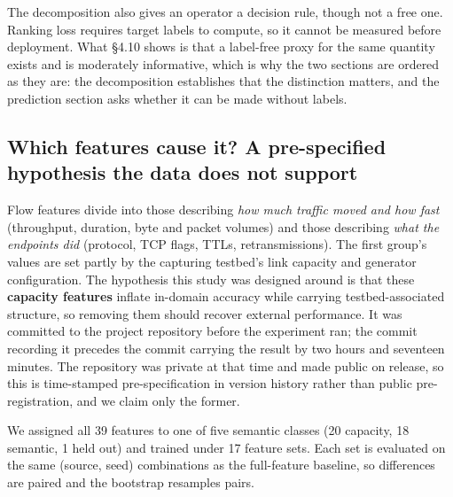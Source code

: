 \documentclass[preprint,12pt]{elsarticle}
\begin{document}
The decomposition also gives an operator a decision rule, though not a free one. Ranking loss requires target labels to compute, so it cannot be measured before deployment. What \S{}4.10 shows is that a label-free proxy for the same quantity exists and is moderately informative, which is why the two sections are ordered as they are: the decomposition establishes that the distinction matters, and the prediction section asks whether it can be made without labels.

\subsection{Which features cause it? A pre-specified hypothesis the data does not support}

Flow features divide into those describing \emph{how much traffic moved and how fast} (throughput, duration, byte and packet volumes) and those describing \emph{what the endpoints did} (protocol, TCP flags, TTLs, retransmissions). The first group's values are set partly by the capturing testbed's link capacity and generator configuration. The hypothesis this study was designed around is that these \textbf{capacity features} inflate in-domain accuracy while carrying testbed-associated structure, so removing them should recover external performance. It was committed to the project repository before the experiment ran; the commit recording it precedes the commit carrying the result by two hours and seventeen minutes. The repository was private at that time and made public on release, so this is time-stamped pre-specification in version history rather than public pre-registration, and we claim only the former.

We assigned all 39 features to one of five semantic classes (20 capacity, 18 semantic, 1 held out) and trained under 17 feature sets. Each set is evaluated on the same (source, seed) combinations as the full-feature baseline, so differences are paired and the bootstrap resamples pairs.
\end{document}
